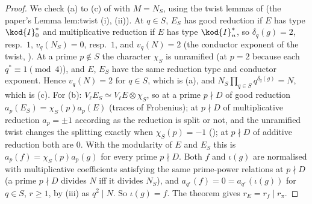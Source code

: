 \begin{proof}
We check (a) to (c) of  with $M=N_S$, using the twist lemmas of  (the paper's Lemma lem:twist (i), (ii)). At $q\in S$, $E_S$ has good
reduction if $E$ has type $\kod{I}_0^*$ and multiplicative reduction if $E$ has type $\kod{I}_n^*$, so $\delta_q(g)=2$, resp.\ $1$, $v_q(N_S)=0$, resp.\ $1$, and $v_q(N)=2$ (the conductor
exponent of the twist, ). At a prime $p\notin S$ the character $\chi_S$ is unramified (at $p=2$ because each $q^*\equiv1\pmod4$), and $E$, $E_S$ have the same reduction type
and conductor exponent. Hence $v_q(N)=2$ for $q\in S$, which is (a), and $N_S\prod_{q\in S}q^{\delta_q(g)}=N$, which is (c). For (b): $V_\ell E_S\simeq V_\ell E\otimes\chi_S$, so at a prime $p\nmid D$ of good
reduction $a_p(E_S)=\chi_S(p)a_p(E)$ (traces of Frobenius); at $p\nmid D$ of multiplicative reduction $a_p=\pm1$ according as the reduction is split or not, and the unramified twist changes the
splitting exactly when $\chi_S(p)=-1$ (); at $p\nmid D$ of additive reduction both are $0$. With the modularity of $E$ and $E_S$ this is $a_p(f)=\chi_S(p)a_p(g)$ for every
prime $p\nmid D$. Both $f$ and $\iota(g)$ are normalised with multiplicative coefficients satisfying the same prime-power relations at $p\nmid D$ (a prime $p\nmid D$ divides $N$ iff it divides
$N_S$), and $a_{q^r}(f)=0=a_{q^r}(\iota(g))$ for $q\in S$, $r\ge1$, by (iii) as $q^2\mid N$. So $\iota(g)=f$. The theorem gives $r_E=r_f\mid r_\pi$.
\end{proof}


